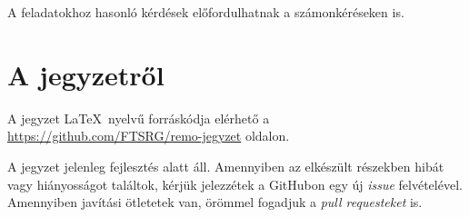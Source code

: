 \begin{tipp}
	A feladatokhoz hasonló kérdések előfordulhatnak a számonkéréseken is.
\end{tipp}

\section*{A jegyzetről}

A jegyzet \LaTeX\ nyelvű forráskódja elérhető a \url{https://github.com/FTSRG/remo-jegyzet} oldalon.

A jegyzet jelenleg fejlesztés alatt áll. Amennyiben az elkészült részekben hibát vagy hiányosságot találtok, kérjük jelezzétek a GitHubon egy új \emph{issue} felvételével. Amennyiben javítási ötletetek van, örömmel fogadjuk a \emph{pull requesteket} is.

